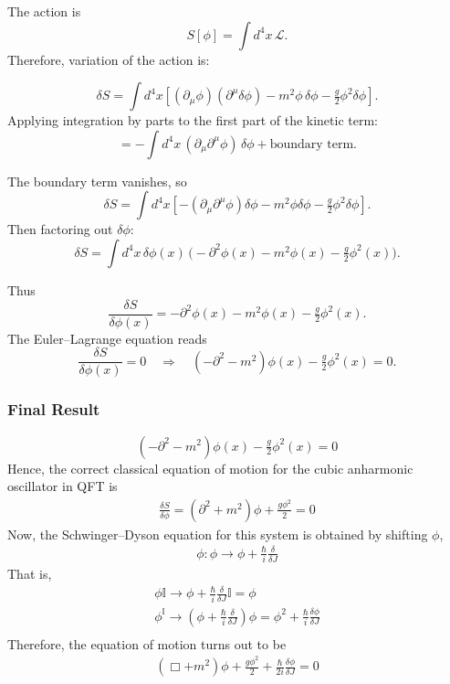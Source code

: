 \documentclass[14pt]{article} %
\begin{document}
{The action is
\[
S[\phi] = \int d^4x \, \mathcal{L}.
\]
Therefore, variation of the action is:

\[
\delta S = \int d^4x \left[ (\partial_\mu \phi)(\partial^\mu \delta \phi) 
- m^2 \phi \, \delta \phi 
- \tfrac{g}{2}\phi^2 \delta \phi \right].
\]
Applying integration by parts to the first part of the kinetic term:
\[
= - \int d^4x \, (\partial_\mu \partial^\mu \phi) \, \delta \phi 
+ \text{boundary term}.
\]

The boundary term vanishes, so
\[
\delta S = \int d^4x \left[ - (\partial_\mu \partial^\mu \phi) \delta \phi 
- m^2 \phi \delta \phi 
- \tfrac{g}{2}\phi^2 \delta \phi \right].
\]
Then factoring out $\delta \phi$:
\[
\delta S = \int d^4x \, \delta \phi(x) \, 
\Big( -\partial^2 \phi(x) - m^2 \phi(x) - \tfrac{g}{2}\phi^2(x) \Big).
\]

Thus
\[
\frac{\delta S}{\delta \phi(x)} 
= -\partial^2 \phi(x) - m^2 \phi(x) - \tfrac{g}{2}\phi^2(x).
\]
The Euler--Lagrange equation reads
\[
\frac{\delta S}{\delta \phi(x)} = 0
\quad \Rightarrow \quad
(-\partial^2 - m^2)\phi(x) - \tfrac{g}{2}\phi^2(x) = 0.
\]
\subsubsection*{Final Result}
\[
\boxed{(-\partial^2 - m^2)\phi(x) - \tfrac{g}{2}\phi^2(x) = 0}
\]
Hence, the correct classical equation of motion for the cubic anharmonic oscillator in QFT is 
\begin{align*}
    \frac{\delta S}{\delta \phi} = (\partial^2 + m^2)\phi + \frac{g \phi^2}{2} = 0 
\end{align*}
Now, the Schwinger–Dyson equation for this system is obtained by shifting  $\phi$,
\begin{align*}
    \phi :\phi \rightarrow \phi + \frac{\hbar}{i} \frac{\delta}{\delta J}
\end{align*}
That is, 
\begin{align*}
    \phi \mathbb{I} \rightarrow \phi + \frac{\hbar}{i} \frac{\delta}{\delta J} \mathbb{I} = \phi \\
    \phi^ \mathbb{I} \rightarrow \left( \phi + \frac{\hbar}{i} \frac{\delta}{\delta J}\right) \phi = \phi^2 + \frac{\hbar}{i} \frac{\delta \phi}{\delta J} \\
\end{align*}
Therefore, the equation of motion turns out to be 
\begin{align*}
\left( \Box + m^2\right) \phi + \frac{g \phi^2}{2} + \frac{\hbar}{2i} \frac{\delta\phi}{\delta J} = 0
\end{align*}
\newpage
}
\end{document}
